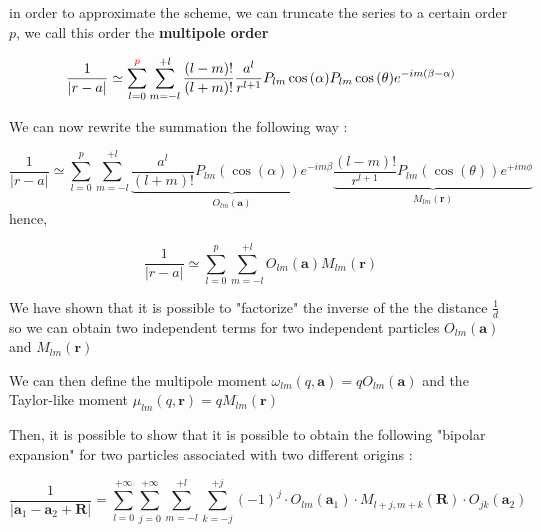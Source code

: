 \documentclass[10pt,twoside,a4paper]{report}
\begin{document}
	in order to approximate the scheme, we can truncate the series to a certain order $p$, we call this order the \textbf{multipole order}
	
	\begin{equation}
	\frac{1}{|r - a|} \simeq \sum\limits_{l=0}^{\textcolor{red}{p}} \sum\limits_{m = -l}^{+l} \frac{(l-m)!}{(l+m)!} \frac{a^l}{r^{l+1}} P_{lm}\cos{(\alpha)}P_{lm}\cos{(\theta)}e^{-im(\beta - \alpha)}
	\end{equation}
	
	We can now rewrite the summation the following way :
	
		\begin{equation}
	\frac{1}{|r - a|} \simeq \sum\limits_{l=0}^{p} \sum\limits_{m = -l}^{+l}
	\underbrace{\frac{a^l}{(l+m)!} P_{lm}(\cos(\alpha))e^{-im\beta}} _{O_{lm}(\textbf{a})}
    \underbrace{\frac{(l-m)!}{r^{l+1}} P_{lm}(\cos(\theta))e^{+im\phi}} _{M_{lm}(\textbf{r})}
	\end{equation}
	hence,
	
		\begin{equation}
	\frac{1}{|r - a|} \simeq \sum\limits_{l=0}^{p} \sum\limits_{m = -l}^{+l}
	{O_{lm}(\textbf{a})}
    {M_{lm}(\textbf{r})}
	\end{equation}
	
	
	We have shown that it is possible to "factorize" the inverse of the the distance $\frac{1}{d}$ so we can obtain two independent terms for two independent particles ${O_{lm}(\textbf{a})}$ and ${M_{lm}(\textbf{r})}$ 


	We can then define the multipole moment $\omega_{lm}(q,\textbf{a}) = q O_{lm}(\textbf{a})$ and the Taylor-like moment $\mu_{lm}(q,\textbf{r}) = q M_{lm}(\textbf{r})$
	
	Then, it is possible to show that it is possible to obtain the following "bipolar expansion" for two particles associated with two different origins :
	
    \begin{equation}
    \frac{1}{|\textbf{a}_1 - \textbf{a}_2 + \textbf{R}|} = 
    \sum\limits_{l=0}^{+\infty}
    \sum\limits_{j=0}^{+\infty}
    \sum\limits_{m=-l}^{+l}
    \sum\limits_{k=-j}^{+j}
    (-1)^j \cdot O_{lm}(\textbf{a}_1) \cdot M_{l+j,m+k}(\textbf{R}) \cdot O_{jk}(\textbf{a}_2)
    \end{equation}
\end{document}
